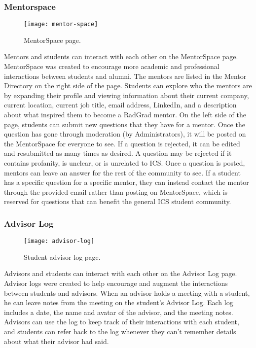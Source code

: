 \subsubsection{Mentorspace}
\begin{figure}[htbp!]
\centering
\texttt{[image: mentor-space]}
\caption{MentorSpace page.}
\end{figure}
Mentors and students can interact with each other on the MentorSpace page. MentorSpace was created to encourage more academic and professional interactions between students and alumni. The mentors are listed in the Mentor Directory on the right side of the page. Students can explore who the mentors are by expanding their profile and viewing information about their current company, current location, current job title, email address, LinkedIn, and a description about what inspired them to become a RadGrad mentor. On the left side of the page, students can submit new questions that they have for a mentor. Once the question has gone through moderation (by  Administrators), it will be posted on the MentorSpace for everyone to see. If a question is rejected, it can be edited and resubmitted as many times as desired. A question may be rejected if it contains profanity, is unclear, or is unrelated to ICS. Once a question is posted, mentors can leave an answer for the rest of the community to see. If a student has a specific question for a specific mentor, they can instead contact the mentor through the provided email rather than posting on MentorSpace, which is reserved for questions that can benefit the general ICS student community. 

\subsubsection{Advisor Log}
\begin{figure}[htbp!]
\centering
\texttt{[image: advisor-log]}
\caption{Student advisor log page.}
\end{figure}
Advisors and students can interact with each other on the Advisor Log page. Advisor logs were created to help encourage and augment the interactions between students and advisors. When an advisor holds a meeting with a student, he can leave notes from the meeting on the student's Advisor Log. Each log includes a date, the name and avatar of the advisor, and the meeting notes. Advisors can use the log to keep track of their interactions with each student, and students can refer back to the log whenever they can't remember details about what their advisor had said. 

